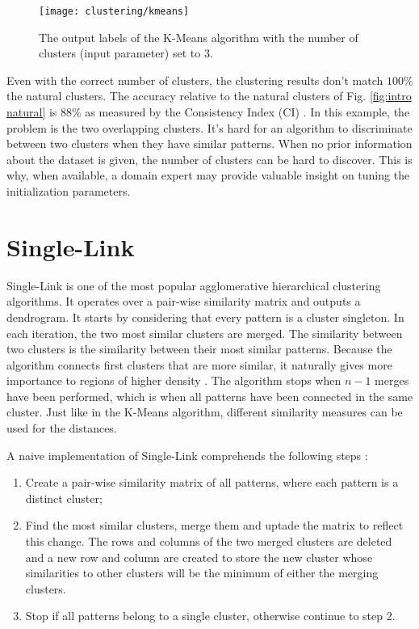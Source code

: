 \begin{figure}[hbtp]
    \centering
    \texttt{[image: clustering/kmeans]}
    \caption{The output labels of the K-Means algorithm with the number of clusters (input parameter) set to 3.}
    \label{fig:intro kmeans}
\end{figure}

Even with the correct number of clusters, the clustering results don't match $100\%$ the natural clusters.
The accuracy relative to the natural clusters of Fig. \ref{fig:intro natural} is $88\%$ as measured by the Consistency Index (CI) \cite{Fred2001}.
In this example, the problem is the two overlapping clusters.
It's hard for an algorithm to discriminate between two clusters when they have similar patterns.
When no prior information about the dataset is given, the number of clusters can be hard to discover.
This is why, when available, a domain expert may provide valuable insight on tuning the initialization parameters.

\section{Single-Link}

Single-Link \cite{sneath1962numerical} is one of the most popular agglomerative hierarchical clustering algorithms.
It operates over a pair-wise similarity matrix and outputs a dendrogram.
It starts by considering that every pattern is a cluster singleton.
In each iteration, the two most similar clusters are merged.
The similarity between two clusters is the similarity between their most similar patterns.
Because the algorithm connects first clusters that are more similar, it naturally gives more importance to regions of higher density \cite{Aggarwal2014}.
The algorithm stops when $n-1$ merges have been performed, which is when all patterns have been connected in the same cluster.
Just like in the K-Means algorithm, different similarity measures can be used for the distances.

A naive implementation of Single-Link comprehends the following steps \cite{Jain1999}:
\begin{enumerate}
    \item Create a pair-wise similarity matrix of all patterns, where each  pattern is a distinct cluster;

    \item Find the most similar clusters, merge them and uptade the matrix to reflect this change. The rows and columns of the two merged clusters are deleted and a new row and column are created to store the new cluster whose similarities to other clusters will be the minimum of either the merging clusters.

    \item Stop if all patterns belong to a single cluster, otherwise continue to step 2.
\end{enumerate}

